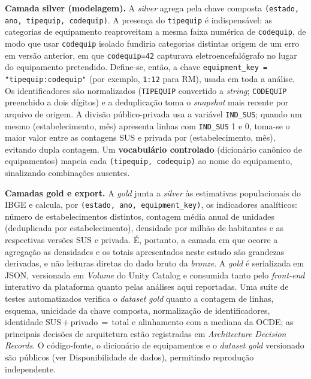 \documentclass[12pt,a4paper,oneside]{article}
\begin{document}
\textbf{Camada silver (modelagem).} A \textit{silver} agrega pela
chave composta \texttt{(estado, ano, tipequip, codequip)}. A presença
do \texttt{tipequip} é indispensável: as categorias de equipamento
reaproveitam a mesma faixa numérica de \texttt{codequip}, de modo que
usar \texttt{codequip} isolado fundiria categorias distintas
\textemdash{} origem de um erro em versão anterior, em que
\texttt{codequip=42} capturava eletroencefalógrafo no lugar do
equipamento pretendido. Define-se, então, a chave
\texttt{equipment\_key = "tipequip:codequip"} (por exemplo,
\texttt{1:12} para RM), usada em toda a análise. Os identificadores são
normalizados (\texttt{TIPEQUIP} convertido a \textit{string};
\texttt{CODEQUIP} preenchido a dois dígitos) e a deduplicação toma o
\textit{snapshot} mais recente por arquivo de origem. A divisão
público-privada usa a variável \texttt{IND\_SUS}; quando um mesmo
(estabelecimento, mês) apresenta linhas com \texttt{IND\_SUS} 1 e 0,
toma-se o maior valor entre as contagens SUS e privada por
(estabelecimento, mês), evitando dupla contagem. Um \textbf{vocabulário
controlado} (dicionário canônico de equipamentos) mapeia cada
\texttt{(tipequip, codequip)} ao nome do equipamento, sinalizando
combinações ausentes.

\textbf{Camadas gold e export.} A \textit{gold} junta a \textit{silver}
às estimativas populacionais do IBGE e calcula, por \texttt{(estado,
ano, equipment\_key)}, os indicadores analíticos: número de
estabelecimentos distintos, contagem média anual de unidades
(deduplicada por estabelecimento), densidade por milhão de habitantes e
as respectivas versões SUS e privada. É, portanto, a camada em que
ocorre a agregação \textemdash{} as densidades e os totais
apresentados neste estudo são grandezas derivadas, e não leituras
diretas do dado bruto da \textit{bronze}. A \textit{gold} é
serializada em JSON, versionada em \textit{Volume} do Unity Catalog e
consumida tanto pelo \textit{front-end} interativo da plataforma quanto
pelas análises aqui reportadas. Uma suíte de testes automatizados
verifica o \textit{dataset} \textit{gold} quanto a contagem de linhas,
esquema, unicidade da chave composta, normalização de identificadores,
identidade SUS\,$+$\,privado\,$=$\,total e alinhamento com a mediana da
OCDE; as principais decisões de arquitetura estão registradas em
\textit{Architecture Decision Records}. O código-fonte, o dicionário de
equipamentos e o \textit{dataset} \textit{gold} versionado são públicos
(ver Disponibilidade de dados), permitindo reprodução independente.
\end{document}
